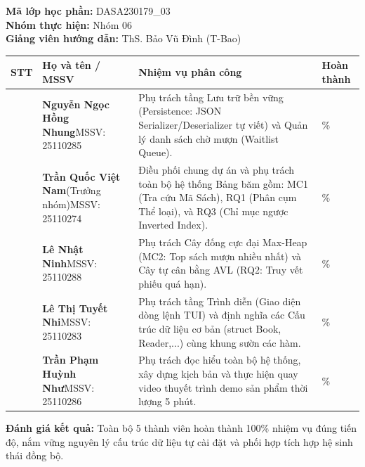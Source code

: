 \documentclass[14pt,a4paper]{extarticle}
\begin{document}
\vspace{-0.25cm}
\noindent
\textbf{Mã lớp học phần:} DASA230179\_03\\[0.1cm]
\textbf{Nhóm thực hiện:} Nhóm 06\\[0.1cm]
\textbf{Giảng viên hướng dẫn:} ThS. Bảo Vũ Đình (T-Bao)\\[0.25cm]
\noindent
\begingroup
{}
\setlength{\tabcolsep}{3pt}
\renewcommand{\arraystretch}{1.0}
\begin{tabularx}{\linewidth}{|>{\centering\arraybackslash}m{1.2cm}|>{\raggedright\arraybackslash}m{3.5cm}|>{\raggedright\arraybackslash}X|>{\centering\arraybackslash}m{2.2cm}|}
\hline
\textbf{STT} & \textbf{Họ và tên / MSSV} & \textbf{Nhiệm vụ phân công} & \textbf{Hoàn thành} \\ \hline
1 & \textbf{Nguyễn Ngọc Hồng Nhung}\newline MSSV: 25110285 & Phụ trách tầng Lưu trữ bền vững (Persistence: JSON Serializer/Deserializer tự viết) và Quản lý danh sách chờ mượn (Waitlist Queue). & 100\% \\ \hline
2 & \textbf{Trần Quốc Việt Nam}\newline (Trưởng nhóm)\newline MSSV: 25110274 & Điều phối chung dự án và phụ trách toàn bộ hệ thống Bảng băm gồm: MC1 (Tra cứu Mã Sách), RQ1 (Phân cụm Thể loại), và RQ3 (Chỉ mục ngược Inverted Index). & 100\% \\ \hline
3 & \textbf{Lê Nhật Ninh}\newline MSSV: 25110288 & Phụ trách Cây đống cực đại Max-Heap (MC2: Top sách mượn nhiều nhất) và Cây tự cân bằng AVL (RQ2: Truy vết phiếu quá hạn). & 100\% \\ \hline
4 & \textbf{Lê Thị Tuyết Nhi}\newline MSSV: 25110283 & Phụ trách tầng Trình diễn (Giao diện dòng lệnh TUI) và định nghĩa các Cấu trúc dữ liệu cơ bản (struct Book, Reader,...) cùng khung sườn các hàm. & 100\% \\ \hline
5 & \textbf{Trần Phạm Huỳnh Như}\newline MSSV: 25110286 & Phụ trách đọc hiểu toàn bộ hệ thống, xây dựng kịch bản và thực hiện quay video thuyết trình demo sản phẩm thời lượng 5 phút. & 100\% \\ \hline
\end{tabularx}
\endgroup

\vspace{0.25cm}
\noindent
\textbf{Đánh giá kết quả:} Toàn bộ 5 thành viên hoàn thành 100\% nhiệm vụ đúng tiến độ, nắm vững nguyên lý cấu trúc dữ liệu tự cài đặt và phối hợp tích hợp hệ sinh thái đồng bộ.
\endgroup
\end{document}
